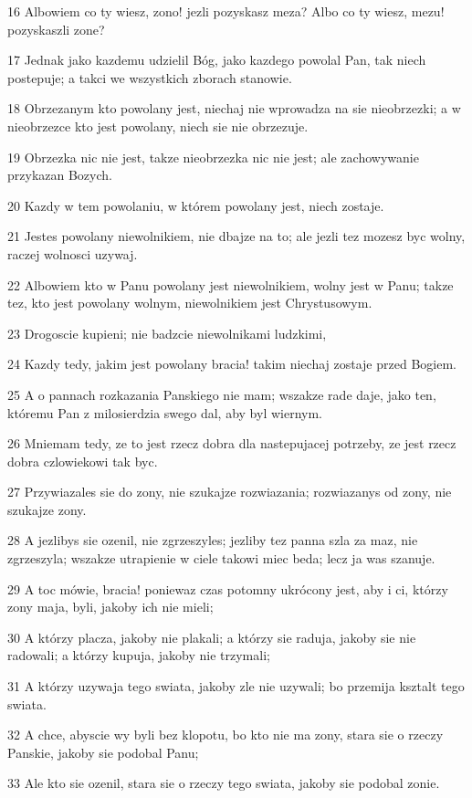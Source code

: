 \par 16 Albowiem co ty wiesz, zono! jezli pozyskasz meza? Albo co ty wiesz, mezu! pozyskaszli zone?
\par 17 Jednak jako kazdemu udzielil Bóg, jako kazdego powolal Pan, tak niech postepuje; a takci we wszystkich zborach stanowie.
\par 18 Obrzezanym kto powolany jest, niechaj nie wprowadza na sie nieobrzezki; a w nieobrzezce kto jest powolany, niech sie nie obrzezuje.
\par 19 Obrzezka nic nie jest, takze nieobrzezka nic nie jest; ale zachowywanie przykazan Bozych.
\par 20 Kazdy w tem powolaniu, w którem powolany jest, niech zostaje.
\par 21 Jestes powolany niewolnikiem, nie dbajze na to; ale jezli tez mozesz byc wolny, raczej wolnosci uzywaj.
\par 22 Albowiem kto w Panu powolany jest niewolnikiem, wolny jest w Panu; takze tez, kto jest powolany wolnym, niewolnikiem jest Chrystusowym.
\par 23 Drogoscie kupieni; nie badzcie niewolnikami ludzkimi,
\par 24 Kazdy tedy, jakim jest powolany bracia! takim niechaj zostaje przed Bogiem.
\par 25 A o pannach rozkazania Panskiego nie mam; wszakze rade daje, jako ten, któremu Pan z milosierdzia swego dal, aby byl wiernym.
\par 26 Mniemam tedy, ze to jest rzecz dobra dla nastepujacej potrzeby, ze jest rzecz dobra czlowiekowi tak byc.
\par 27 Przywiazales sie do zony, nie szukajze rozwiazania; rozwiazanys od zony, nie szukajze zony.
\par 28 A jezlibys sie ozenil, nie zgrzeszyles; jezliby tez panna szla za maz, nie zgrzeszyla; wszakze utrapienie w ciele takowi miec beda; lecz ja was szanuje.
\par 29 A toc mówie, bracia! poniewaz czas potomny ukrócony jest, aby i ci, którzy zony maja, byli, jakoby ich nie mieli;
\par 30 A którzy placza, jakoby nie plakali; a którzy sie raduja, jakoby sie nie radowali; a którzy kupuja, jakoby nie trzymali;
\par 31 A którzy uzywaja tego swiata, jakoby zle nie uzywali; bo przemija ksztalt tego swiata.
\par 32 A chce, abyscie wy byli bez klopotu, bo kto nie ma zony, stara sie o rzeczy Panskie, jakoby sie podobal Panu;
\par 33 Ale kto sie ozenil, stara sie o rzeczy tego swiata, jakoby sie podobal zonie.
